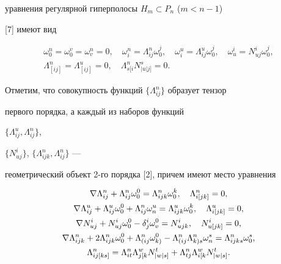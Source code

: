 уравнения регулярной гиперполосы $H_m\subset P_n$ ($m<n-1$) 


[7] имеют вид 


\begin{equation} 


\begin{array}{c} 


\omega^n_0=\omega^v_0=\omega^n_v=0,\quad 


\omega^n_i=\Lambda^n_{ij}\omega^j_0,\quad 


\omega^u_i=\Lambda^u_{ij}\omega^j_0,\quad 


\omega^i_u=N^i_{u j}\omega^j_0,\\ 


%


\Lambda^n_{[ij]}=\Lambda^u_{[ij]}=0,\quad 


\Lambda^n_{s[i}N^s_{|u|j]}=0. 


\end{array} 


\end{equation} 


Отметим, что совокупность функций $\{\Lambda^n_{ij}\}$ образует тензор 


первого порядка, а каждый из наборов функций 


$\{\Lambda^u_{ij},\Lambda^n_{ij}\}$, 


$\{N^i_{u j}\}$, $\{\Lambda^n_{ij k},\Lambda^n_{ij}\}$ --- 


геометрический объект 2-го порядка [2], причем имеют место уравнения


\begin{gather} 


\nabla\Lambda^n_{ij}+\Lambda^n_{ij}\omega^0_0= 


\Lambda^n_{ij k}\omega^k_0,\quad \Lambda^n_{i[jk]}=0,\notag \\ 


%


\nabla\Lambda^u_{ij}+\Lambda^u_{ij}\omega^0_0+ 


\Lambda^n_{ij}\omega^u_n=\Lambda^u_{ij k}\omega^k_0,\quad 


\Lambda^u_{i[jk]}=0,\notag \\ 


\nabla N^i_{u j}+N^i_{u j}\omega^0_0-\delta^i_j\omega^0_v= 


N^i_{u j k},\quad N^i_{u[j k]}=0,\\ 


\nabla\Lambda^n_{ij k}+2\Lambda^n_{ij k}\omega^0_0+ 


\Lambda^n_{(ij}\omega^0_{k)}-\Lambda^n_{(ij}\Lambda^n_{k)s} 


\omega^s_n=\Lambda^n_{ij k s}\omega^s_0,\notag \\ 


\Lambda^n_{ij[k s]}=\Lambda^n_{it}\Lambda^w_{j[k} 


N^t_{|w|s]}+\Lambda^n_{t j}\Lambda^w_{i[k}N^t_{|w|s]}.\notag 


\end{gather} 


